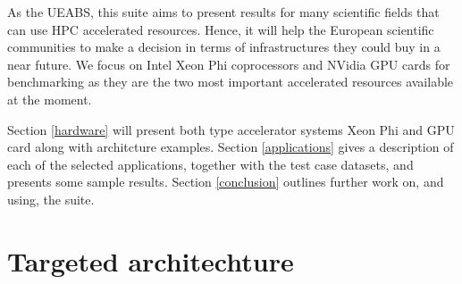 As the UEABS, this suite aims to present results for many scientific fields that can use HPC accelerated resources. Hence, it will help the European scientific communities to make a decision in terms of infrastructures they could buy in a near future. We focus on Intel Xeon Phi coprocessors and NVidia GPU cards for benchmarking as they are the two most important accelerated resources available at the moment.

Section \ref{hardware} will present both type accelerator systems Xeon Phi and GPU card along with architcture examples. Section \ref{applications} gives a description of each of the selected applications, together with the test case datasets, and presents some sample results. Section \ref{conclusion} outlines further work on, and using, the suite.

\part{Targeted architechture}





